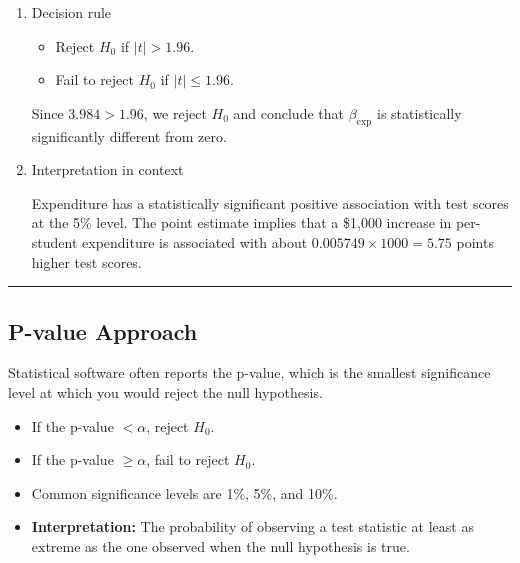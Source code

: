 \documentclass[
  12pt,
  a4paper,
]{scrbook}
\providecommand{\tightlist}{%
  \setlength{\itemsep}{0pt}\setlength{\parskip}{0pt}}
\renewcommand{\tightlist}{\setlength{\itemsep}{0.5\baselineskip}\setlength{\parskip}{0.2\baselineskip}}
\theoremstyle{plain}
\theoremstyle{definition}
\theoremstyle{remark}
\begin{document}
\begin{enumerate}
\begin{tcolorbox}
  Notice that when df is large, the critical value approaches that of
  the standard normal distribution, \(z_{0.975}=1.96\).

  The rule-of-thumb is that when \(df > 30\), you can use the standard
  normal critical values.

  \end{tcolorbox}
\item
  Decision rule

  \begin{itemize}
  \tightlist
  \item
    Reject \(H_0\) if \(|t|>1.96\).
  \item
    Fail to reject \(H_0\) if \(|t|\leq 1.96\).
  \end{itemize}

  Since \(3.984>1.96\), we reject \(H_0\) and conclude that
  \(\beta_{\text{exp}}\) is statistically significantly different from
  zero.
\item
  Interpretation in context

  Expenditure has a statistically significant positive association with
  test scores at the 5\% level. The point estimate implies that a
  {\$1,000} increase in per-student expenditure is associated with about
  \(0.005749\times 1000=5.75\) points higher test scores.
\end{enumerate}

\begin{center}\rule{0.5\linewidth}{0.5pt}\end{center}

\subsection{P-value Approach}\label{p-value-approach}

Statistical software often reports the p-value, which is the smallest
significance level at which you would reject the null hypothesis.

\begin{itemize}
\tightlist
\item
  If the p-value \(< \alpha\), reject \(H_0\).
\item
  If the p-value \(\geq \alpha\), fail to reject \(H_0\).
\item
  Common significance levels are 1\%, 5\%, and 10\%.
\item
  \textbf{Interpretation:} The probability of observing a test statistic
  at least as extreme as the one observed {when the null hypothesis is
  true}.
\end{itemize}
\end{document}
